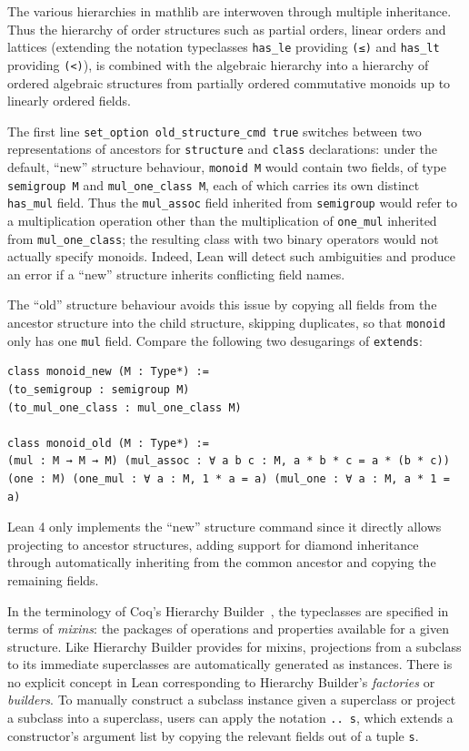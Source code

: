 \documentclass[a4paper,UKenglish,cleveref, autoref, thm-restate]{lipics-v2021}
\newcommand{\mathlib}{\textsf{mathlib}\xspace}
\begin{document}
The various hierarchies in \mathlib are interwoven through multiple inheritance.
Thus the hierarchy of order structures such as partial orders, linear orders and lattices (extending the notation typeclasses \lstinline{has_le} providing \lstinline{(≤)} and \lstinline{has_lt} providing \lstinline{(<)}),
is combined with the algebraic hierarchy into a hierarchy of ordered algebraic structures from partially ordered commutative monoids up to linearly ordered fields.

The first line \lstinline{set_option old_structure_cmd true} switches between two representations
of ancestors for \lstinline{structure} and \lstinline{class} declarations:
under the default, ``new'' structure behaviour,
\lstinline{monoid M} would contain two fields, of type \lstinline{semigroup M} and \lstinline{mul_one_class M}, each of which carries its own distinct \lstinline{has_mul} field.
Thus the \lstinline{mul_assoc} field inherited from \lstinline{semigroup} would refer to a multiplication operation
other than the multiplication of \lstinline{one_mul} %
inherited from \lstinline{mul_one_class};
the resulting class with two binary operators would not actually specify monoids.
Indeed, Lean will detect such ambiguities and produce an error if a ``new'' structure inherits conflicting field names.

The ``old'' structure behaviour avoids this issue by copying all fields from the ancestor structure into the child structure, skipping duplicates,
so that \lstinline{monoid} only has one \lstinline{mul} field.
Compare the following two desugarings of \lstinline{extends}:
\begin{lstlisting}
class monoid_new (M : Type*) :=
(to_semigroup : semigroup M)
(to_mul_one_class : mul_one_class M)

class monoid_old (M : Type*) :=
(mul : M → M → M) (mul_assoc : ∀ a b c : M, a * b * c = a * (b * c))
(one : M) (one_mul : ∀ a : M, 1 * a = a) (mul_one : ∀ a : M, a * 1 = a)
\end{lstlisting}

Lean 4 only implements the ``new'' structure command since it directly allows projecting to ancestor structures, %
adding support for diamond inheritance through automatically inheriting from the common ancestor and copying the remaining fields.

In the terminology of Coq's Hierarchy Builder~\cite{hierarchy-builder}, the typeclasses are specified in terms of \emph{mixins}:
the packages of operations and properties available for a given structure.
Like Hierarchy Builder provides for mixins, projections from a subclass to its immediate superclasses are automatically generated as instances.
There is no explicit concept in Lean corresponding to Hierarchy Builder's \emph{factories} or \emph{builders}.
To manually construct a subclass instance given a superclass or project a subclass into a superclass,
users can apply the notation \lstinline!.. s!, which extends a constructor's argument list by copying the relevant fields out of a tuple \lstinline{s}.
\end{document}
